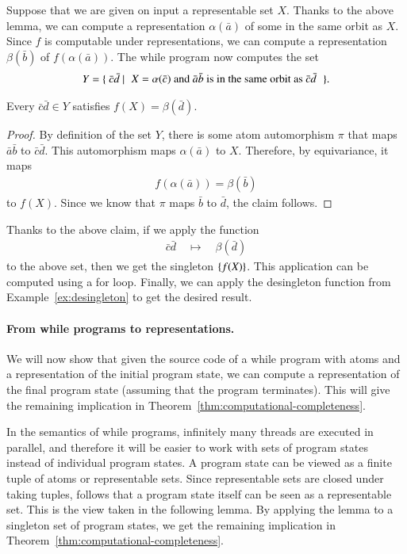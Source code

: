 Suppose that we are given on input a representable set $X$. Thanks to the above lemma, we can compute a representation $\alpha(\bar a)$ of some in the same orbit as $X$. Since $f$ is computable under representations, we can compute a representation $\beta(\bar b)$ of $f(\alpha(\bar a))$. The while program now computes the set 
\begin{align*}
Y = \setbuild{\bar c \bar d}{$X = \alpha(\bar c)$ and $\bar a \bar b$ is in the same orbit as $\bar c \bar d$}.
\end{align*}

\begin{claim}
	Every $\bar c \bar d \in Y$ satisfies $f(X)=\beta(\bar d)$.
\end{claim}
\begin{proof}
	By definition of the set $Y$,  there is some atom automorphism $\pi$ that maps $\bar a \bar b$ to $\bar c \bar d$. This automorphism maps $\alpha(\bar a)$ to $X$. Therefore, by equivariance, it maps 
	\begin{align*}
		f(\alpha(\bar a)) = \beta(\bar b)
	\end{align*}
	to $f(X)$. Since we know that $\pi$ maps $\bar b$ to $\bar d$, the claim follows.
\end{proof}

Thanks to the above claim, if we apply the function 
\begin{align*}
\bar c \bar d \quad \mapsto \quad  \beta(\bar d)
\end{align*}
to the above set, then we get the singleton $\{f(X)\}$. This application can be computed using a for loop. Finally, we can apply the desingleton function from Example~\ref{ex:desingleton} to get the desired result.

 \paragraph*{From while programs to representations.} We will now show that given the source code of a while program with atoms and a representation of the initial program state, we can compute a representation of the final program state (assuming that the program terminates). This will give the remaining implication in Theorem~\ref{thm:computational-completeness}.


In the semantics of while programs, infinitely many threads are executed in parallel, and therefore it will be easier to work with sets of program states instead of individual program states. A program state can be viewed as a finite tuple of atoms or representable sets.  Since representable sets are closed under taking tuples, follows that a program state itself can be seen as a representable set. This is the view taken in the following lemma.  
By applying the  lemma to a singleton set of program states, we get the remaining implication in Theorem~\ref{thm:computational-completeness}.



